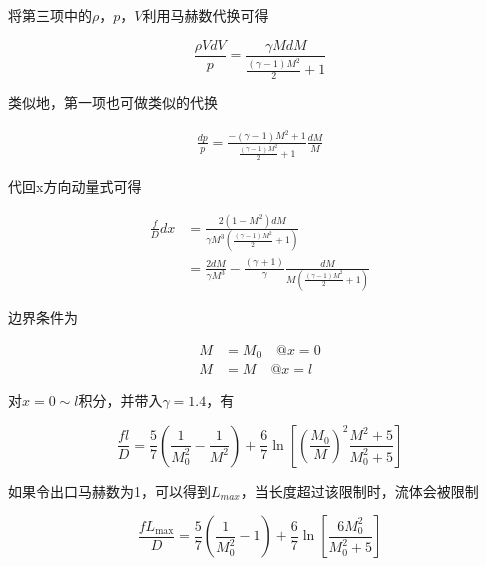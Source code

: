 将第三项中的$\rho$，$p$，$V$利用马赫数代换可得

\begin{equation*}
    \frac{\rho V d V}{p}=\frac{\gamma M d M}{\frac{(\gamma-1) M^{2}}{2}+1}
\end{equation*}

类似地，第一项也可做类似的代换

\begin{align*}
    \frac{d p}{p}=\frac{-(\gamma-1) M^{2}+1}{\frac{(\gamma-1) M^{2}}{2}+1} \frac{d M}{M}
\end{align*}

代回x方向动量式可得

\begin{align*}
    \frac{f}{D} d x&=\frac{2\left(1-M^{2}\right) d M}{\gamma M^{3}\left(\frac{(\gamma-1) M^{2}}{2}+1\right)}\\ 
    &=\frac{2 d M}{\gamma M^{3}}-\frac{(\gamma+1)}{\gamma} \frac{d M}{M\left(\frac{(\gamma-1) M^{2}}{2}+1\right)}
\end{align*}

边界条件为

\begin{align*}
    M&=M_0\quad @x=0\\ 
    M&=M\quad @x=l
\end{align*}

对$x=0\sim l$积分，并带入$\gamma=1.4$，有

\begin{equation*}
    \frac{f l}{D}=\frac{5}{7}\left(\frac{1}{M_{0}^{2}}-\frac{1}{M^{2}}\right)+\frac{6}{7} \ln \left[\left(\frac{M_{0}}{M}\right)^{2} \frac{M^{2}+5}{M_{0}^{2}+5}\right]
\end{equation*}

如果令出口马赫数为1，可以得到$L_{max}$，当长度超过该限制时，流体会被限制

\begin{equation*}
    \frac{f L_{\max }}{D}=\frac{5}{7}\left(\frac{1}{M_{0}^{2}}-1\right)+\frac{6}{7} \ln \left[\frac{6 M_{0}^{2}}{M_{0}^{2}+5}\right]
\end{equation*}
